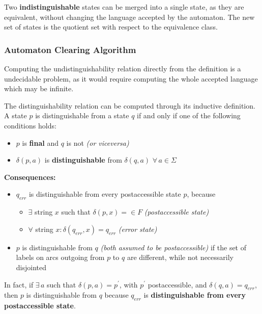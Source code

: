 \documentclass[english]{article}
\begin{document}
Two \textbf{indistinguishable} states can be merged into a single state, as they are equivalent, without changing the language accepted by the automaton.
The new set of states is the quotient set with respect to the equivalence class.

\subsubsection{Automaton Clearing Algorithm}

Computing the undistinguishability relation directly from the definition is a undecidable problem, as it would require computing the whole accepted language which may be infinite.

The distinguishability relation can be computed through its inductive definition.
A state \(p\) is distinguishable from a state \(q\) if and only if one of the following conditions holds:

\begin{itemize}
  \item \(p\) is \textbf{final} and \(q\) is not \textit{(or viceversa)}
  \item \(\delta(p, a)\) is \textbf{distinguishable} from \(\delta(q, a)\) \(\forall \, a \in \Sigma\)
\end{itemize}

\textbf{Consequences:}

\begin{itemize}[label=\(\Rightarrow\)]
  \item \(q_\textit{err}\) is distinguishable from every postaccessible state \(p\), because
        \begin{itemize}
          \item \(\exists\) string \(x\) such that \(\delta(p, x) = \in F\) \textit{(postaccessible state)}
          \item \(\forall\) string \(x: \delta(q_\textit{err}, x) = q_\textit{err}\) \textit{(error state)}
        \end{itemize}
  \item \(p\) is distinguishable from \(q\) \textit{(both assumed to be postaccessible)} if the set of labels on arcs outgoing from \(p\) to \(q\) are different, while not necessarily disjointed
\end{itemize}

In fact, if \(\exists \, a\) such that \(\delta(p, a) = p^\prime\), with \(p^\prime\) postaccessible, and \(\delta(q, a) = q_\textit{err}\), then \(p\) is distinguishable from \(q\) because \(q_\textit{err}\) is \textbf{distinguishable from every postaccessible state}.
\end{document}
